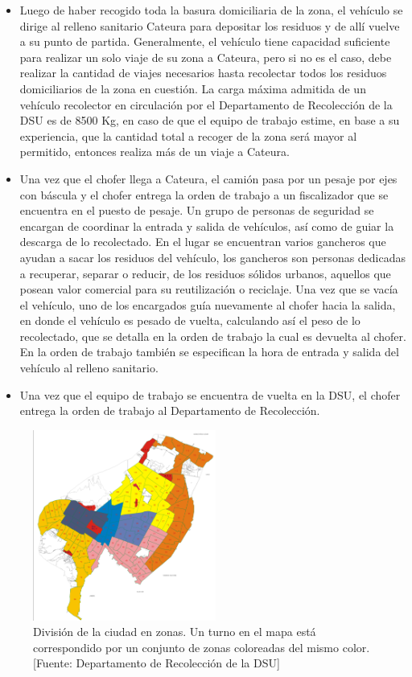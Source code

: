 \begin{itemize}
\item Luego de haber recogido toda la basura domiciliaria de la zona, el vehículo se dirige al relleno sanitario Cateura para depositar los residuos y de allí vuelve a su punto de partida. Generalmente, el vehículo tiene capacidad suficiente para realizar un solo viaje de su zona a Cateura, pero si no es el caso, debe realizar la cantidad de viajes necesarios hasta recolectar todos los residuos domiciliarios de la zona en cuestión. La carga máxima admitida de un vehículo recolector en circulación por el Departamento de Recolección de la DSU es de 8500 Kg, en caso de que el equipo de trabajo estime, en base a su experiencia, que la cantidad total a recoger de la zona será mayor al permitido, entonces realiza más de un viaje a Cateura.
\item Una vez que el chofer llega a Cateura, el camión pasa por un pesaje por ejes con báscula y el chofer entrega la orden de trabajo a un fiscalizador que se encuentra en el puesto de pesaje. Un grupo de personas de seguridad se encargan de coordinar la entrada y salida de vehículos, así como de guiar la descarga de lo recolectado. En el lugar se encuentran varios gancheros que ayudan a sacar los residuos del vehículo, los gancheros son personas dedicadas a recuperar, separar o reducir, de los residuos sólidos urbanos, aquellos que posean valor comercial para su reutilización o reciclaje. Una vez que se vacía el vehículo, uno de los encargados guía nuevamente al chofer hacia la salida, en donde el vehículo es pesado de vuelta, calculando así el peso de lo recolectado, que se detalla en la orden de trabajo la cual es devuelta al chofer. En la orden de trabajo también se especifican la hora de entrada y salida del vehículo al relleno sanitario.
\item Una vez que el equipo de trabajo se encuentra de vuelta en la DSU, el chofer entrega la orden de trabajo al Departamento de Recolección.
\end{itemize}

\begin{figure}[H]
    \centering
    \includegraphics[width=6cm]{Recoleccion-ZONAS&CUADRANTES.png}
    \caption{División de la ciudad en zonas. Un turno en el mapa está correspondido por un conjunto de zonas coloreadas del mismo color. [Fuente: Departamento de Recolección de la DSU]}
    \label{fig:zonasRecoleccion}
\end{figure}

